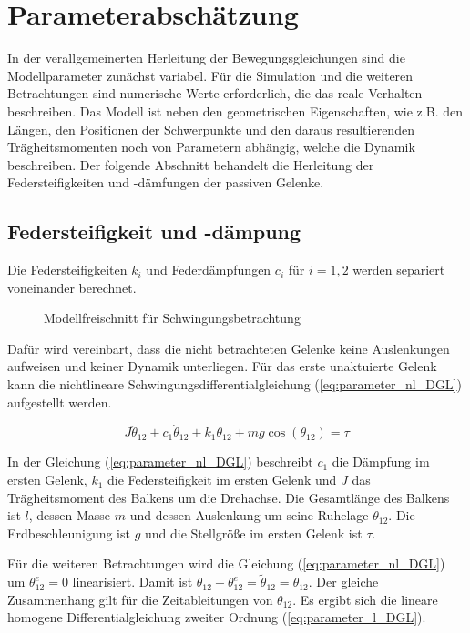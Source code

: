 \newpage
\chapter{Parameterabschätzung}

In der verallgemeinerten Herleitung der Bewegungsgleichungen sind die Modellparameter zunächst variabel. Für die Simulation und die weiteren Betrachtungen sind numerische Werte erforderlich, die das reale Verhalten beschreiben. Das Modell ist neben den geometrischen Eigenschaften, wie z.B. den Längen, den Positionen der Schwerpunkte und den daraus resultierenden Trägheitsmomenten noch von Parametern abhängig, welche die Dynamik beschreiben. Der folgende Abschnitt behandelt die Herleitung der Federsteifigkeiten und -dämfungen der passiven Gelenke.

\section{Federsteifigkeit und -dämpung}

Die Federsteifigkeiten $k_i$ und Federdämpfungen $c_i$ für $i=1,2$ werden separiert voneinander berechnet. 

\begin{figure}[h]
	\centering
	
	\caption[Modellparameter]{Modellfreischnitt für Schwingungsbetrachtung}
	\label{fig:parameter_abschaetung}
\end{figure}

Dafür wird vereinbart, dass die nicht betrachteten Gelenke keine Auslenkungen aufweisen und keiner Dynamik unterliegen. 
Für das erste unaktuierte Gelenk kann die nichtlineare Schwingungsdifferentialgleichung (\ref{eq:parameter_nl_DGL}) aufgestellt werden. 

\begin{equation} \label{eq:parameter_nl_DGL}
J\ddot{\theta}_{12}+c_1\dot{\theta}_{12}+k_1\theta_{12}+mg\cos(\theta_{12})=\tau
\end{equation}

In der Gleichung (\ref{eq:parameter_nl_DGL}) beschreibt $c_1$ die Dämpfung im ersten Gelenk, $k_1$ die Federsteifigkeit im ersten Gelenk und $J$ das Trägheitsmoment des Balkens um die Drehachse. Die Gesamtlänge des Balkens ist $l$, dessen Masse $m$ und dessen Auslenkung um seine Ruhelage $\theta_{12}$. Die Erdbeschleunigung ist $g$ und die Stellgröße im ersten Gelenk ist $\tau$.

Für die weiteren Betrachtungen wird die Gleichung (\ref{eq:parameter_nl_DGL}) um $\theta_{12}^e=0$ linearisiert. Damit ist $\theta_{12}-\theta_{12}^e=\tilde{\theta}_{12}=\theta_{12}$. Der gleiche Zusammenhang gilt für die Zeitableitungen von $\theta_{12}$. Es ergibt sich die lineare homogene Differentialgleichung zweiter Ordnung (\ref{eq:parameter_l_DGL}).

